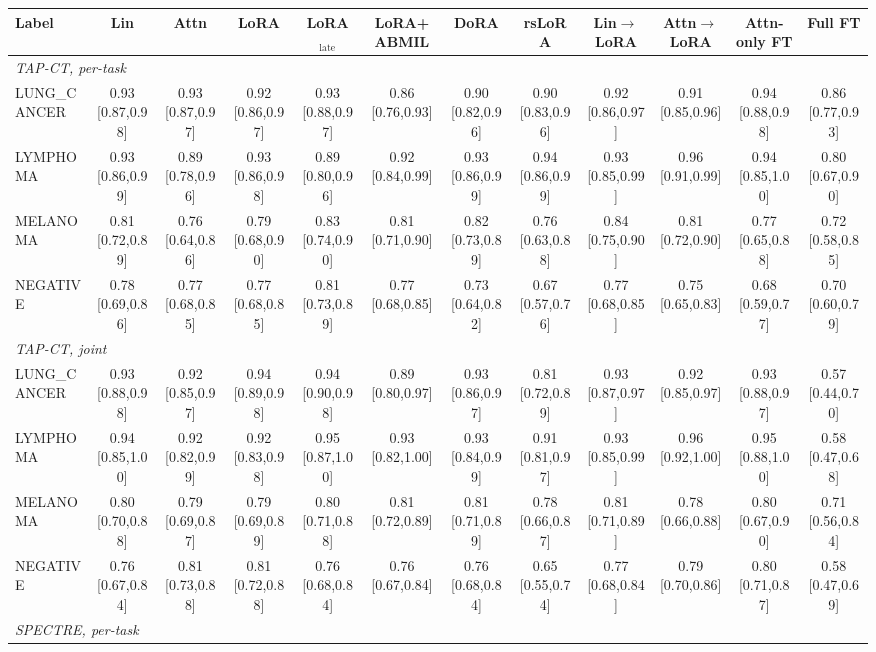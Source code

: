 \begin{tabular}{lccccccccccc}
\toprule
Label & Lin & Attn & LoRA & LoRA$_{\text{late}}$ & LoRA+ABMIL & DoRA & rsLoRA & Lin$\to$LoRA & Attn$\to$LoRA & Attn-only FT & Full FT \\
\midrule
\multicolumn{12}{l}{\textit{TAP-CT, per-task}} \\
LUNG\_CANCER & 0.93 [0.87,0.98] & 0.93 [0.87,0.97] & 0.92 [0.86,0.97] & 0.93 [0.88,0.97] & 0.86 [0.76,0.93] & 0.90 [0.82,0.96] & 0.90 [0.83,0.96] & 0.92 [0.86,0.97] & 0.91 [0.85,0.96] & 0.94 [0.88,0.98] & 0.86 [0.77,0.93] \\
LYMPHOMA & 0.93 [0.86,0.99] & 0.89 [0.78,0.96] & 0.93 [0.86,0.98] & 0.89 [0.80,0.96] & 0.92 [0.84,0.99] & 0.93 [0.86,0.99] & 0.94 [0.86,0.99] & 0.93 [0.85,0.99] & 0.96 [0.91,0.99] & 0.94 [0.85,1.00] & 0.80 [0.67,0.90] \\
MELANOMA & 0.81 [0.72,0.89] & 0.76 [0.64,0.86] & 0.79 [0.68,0.90] & 0.83 [0.74,0.90] & 0.81 [0.71,0.90] & 0.82 [0.73,0.89] & 0.76 [0.63,0.88] & 0.84 [0.75,0.90] & 0.81 [0.72,0.90] & 0.77 [0.65,0.88] & 0.72 [0.58,0.85] \\
NEGATIVE & 0.78 [0.69,0.86] & 0.77 [0.68,0.85] & 0.77 [0.68,0.85] & 0.81 [0.73,0.89] & 0.77 [0.68,0.85] & 0.73 [0.64,0.82] & 0.67 [0.57,0.76] & 0.77 [0.68,0.85] & 0.75 [0.65,0.83] & 0.68 [0.59,0.77] & 0.70 [0.60,0.79] \\
\multicolumn{12}{l}{\textit{TAP-CT, joint}} \\
LUNG\_CANCER & 0.93 [0.88,0.98] & 0.92 [0.85,0.97] & 0.94 [0.89,0.98] & 0.94 [0.90,0.98] & 0.89 [0.80,0.97] & 0.93 [0.86,0.97] & 0.81 [0.72,0.89] & 0.93 [0.87,0.97] & 0.92 [0.85,0.97] & 0.93 [0.88,0.97] & 0.57 [0.44,0.70] \\
LYMPHOMA & 0.94 [0.85,1.00] & 0.92 [0.82,0.99] & 0.92 [0.83,0.98] & 0.95 [0.87,1.00] & 0.93 [0.82,1.00] & 0.93 [0.84,0.99] & 0.91 [0.81,0.97] & 0.93 [0.85,0.99] & 0.96 [0.92,1.00] & 0.95 [0.88,1.00] & 0.58 [0.47,0.68] \\
MELANOMA & 0.80 [0.70,0.88] & 0.79 [0.69,0.87] & 0.79 [0.69,0.89] & 0.80 [0.71,0.88] & 0.81 [0.72,0.89] & 0.81 [0.71,0.89] & 0.78 [0.66,0.87] & 0.81 [0.71,0.89] & 0.78 [0.66,0.88] & 0.80 [0.67,0.90] & 0.71 [0.56,0.84] \\
NEGATIVE & 0.76 [0.67,0.84] & 0.81 [0.73,0.88] & 0.81 [0.72,0.88] & 0.76 [0.68,0.84] & 0.76 [0.67,0.84] & 0.76 [0.68,0.84] & 0.65 [0.55,0.74] & 0.77 [0.68,0.84] & 0.79 [0.70,0.86] & 0.80 [0.71,0.87] & 0.58 [0.47,0.69] \\
\multicolumn{12}{l}{\textit{SPECTRE, per-task}} \\

\end{tabular}
